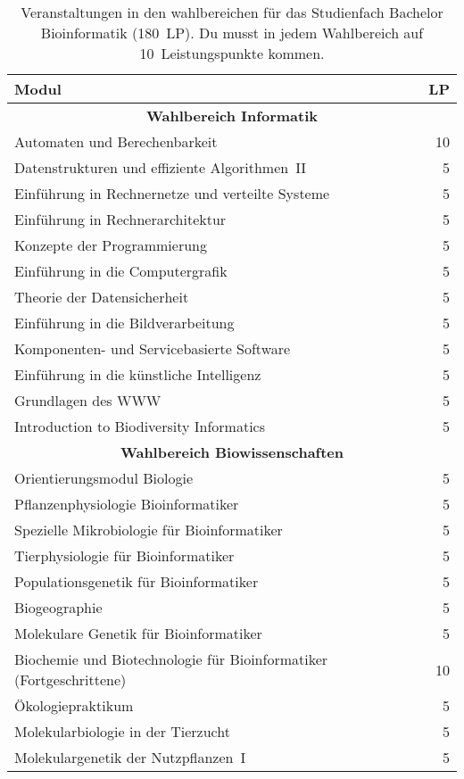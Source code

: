 \begin{table}[!th]
	\begin{small}
		\begin{tabularx}{\textwidth}{|X||r|}
			\hline
			\textbf{Modul}&\textbf{LP}\\\hline\hline
			\multicolumn{2}{|c|}{\textbf{Wahlbereich Informatik}}\\\hline
			Automaten und Berechenbarkeit&10\\\hline
			Datenstrukturen und effiziente Algorithmen~II&5\\\hline
			Einführung in Rechnernetze und verteilte Systeme&5\\\hline
			Einführung in Rechnerarchitektur&5\\\hline
			Konzepte der Programmierung&5\\\hline
			Einführung in die Computergrafik&5\\\hline
			Theorie der Datensicherheit&5\\\hline
			Einführung in die Bildverarbeitung&5\\\hline
			Komponenten- und Servicebasierte Software&5\\\hline
			Einführung in die künstliche Intelligenz&5\\\hline
			Grundlagen des WWW&5\\\hline
			Introduction to Biodiversity Informatics&5\\\hline\hline
			\multicolumn{2}{|c|}{\textbf{Wahlbereich Biowissenschaften}}\\\hline
			Orientierungsmodul Biologie&5\\\hline
			Pflanzenphysiologie Bioinformatiker&5\\\hline
			Spezielle Mikrobiologie für Bioinformatiker&5\\\hline
			Tierphysiologie für Bioinformatiker&5\\\hline
			Populationsgenetik für Bioinformatiker&5\\\hline
			Biogeographie&5\\\hline
			Molekulare Genetik für Bioinformatiker&5\\\hline
			Biochemie und Biotechnologie für Bioinformatiker (Fortgeschrittene)&10\\\hline
			Ökologiepraktikum&5\\\hline
			Molekularbiologie in der Tierzucht&5\\\hline
			Molekulargenetik der Nutzpflanzen~I&5\\\hline
		\end{tabularx}
	\end{small}
	\caption{Veranstaltungen in den wahlbereichen für das Studienfach Bachelor Bioinformatik (180~LP). Du musst in jedem Wahlbereich auf 10~Leistungspunkte kommen.\label{plan-bioinfo2}}
\end{table}

